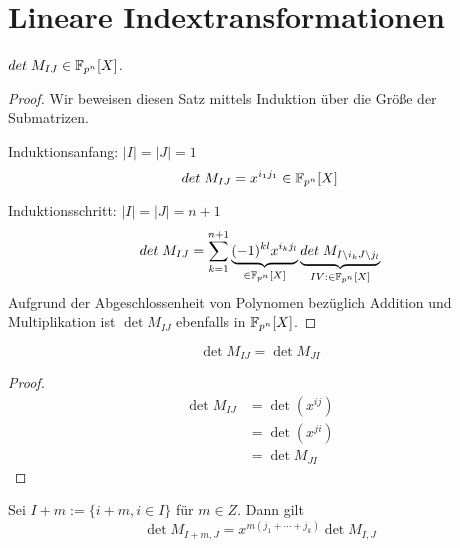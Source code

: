 \section{Lineare Indextransformationen}

\begin{lemma} \label{lemma:det-polynom}
    $det\; M_{IJ} \in \mathbb{F}_{p^n}[X]$.
\end{lemma}

\begin{proof}
    Wir beweisen diesen Satz mittels Induktion über die Größe der Submatrizen. 

    Induktionsanfang: $|I| = |J| = 1$
    \begin{equation*}
        det\; M_{IJ} = x^{i_1j_1} \in \mathbb{F}_{p^n}[X]
    \end{equation*}

    Induktionsschritt: $|I| = |J| = n+1$
    \begin{equation*}
        det\; M_{IJ} = \sum_{k=1}^{n+1} \underbrace{(-1)^{kl} x^{i_kj_l}}_{\in \mathbb{F}_{p^n}[X]} \underbrace{det\; M_{I\backslash i_k J \backslash j_l}}_{IV: \in \mathbb{F}_{p^n}[X]}
    \end{equation*}
    Aufgrund der Abgeschlossenheit von Polynomen bezüglich Addition und Multiplikation ist $\det M_{IJ}$ ebenfalls in $\mathbb{F}_{p^n}[X]$.
\end{proof}

\begin{lemma} \label{lemma:transpose}
    \begin{equation*}
        \det M_{IJ} = \det M_{JI}
    \end{equation*}
\end{lemma}

\begin{proof}
    \begin{align*}
        \det M_{IJ} &= \det (x^{ij}) \\
                    &= \det (x^{ji}) \\
                    &= \det M_{JI}
    \end{align*}
\end{proof}

\begin{lemma} \label{lemma:translation}
    Sei $I + m := \{ i + m, i \in I\}$ für $m \in Z$. Dann gilt
    \begin{equation*}
        \det{} M_{I+m,J} = x^{m(j_1+\cdots +j_k)} \det M_{I,J}
    \end{equation*}
\end{lemma}

